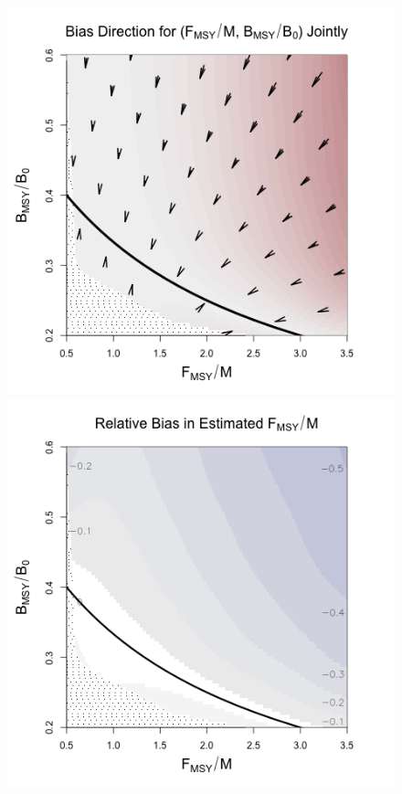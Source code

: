 \begin{figure}[h!]
\begin{minipage}[h!]{0.49\textwidth}
\includegraphics[width=1.1\textwidth]{../gpBias/directionalBiasSchnuteSubTitleExpT45N150Wide.png}\\
\hspace*{1cm}
\includegraphics[width=1.1\textwidth]{../gpBias/fMSYRelBiasSchnuteExpT45N150Wide.png}
\end{minipage}
\end{figure}

